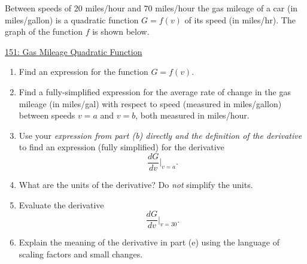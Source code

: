 \documentclass{ximera}
\begin{document}
\begin{question} \label{Q9df93rv}
Between speeds of $20$ miles/hour and $70$ miles/hour the gas mileage of a car (in miles/gallon) is a quadratic function $G=f(v)$ of its speed (in miles/hr). The graph of the function $f$ is shown below.

\begin{onlineOnly}
    \begin{center}
\end{center}
\end{onlineOnly}

\href{https://www.desmos.com/calculator/6bbnti8zm5}{151: Gas Mileage Quadratic Function}

\begin{enumerate}
\item Find an expression for the function $G=f(v)$.

\item Find a fully-simplified expression for the average rate of change in the gas mileage (in miles/gal) with respect to speed (measured in miles/gallon) between speeds $v=a$ and $v=b$, both measured in miles/hour.

\item  Use your \emph{expression from part (b) directly and the definition of the derivative} to find an expression (fully simplified) for the derivative
\[
   \frac{dG}{dv}\Big|_{v=a} .
\]

\item What are the units of the derivative? Do \emph{not} simplify the units.

\item Evaluate the derivative
\[
  \frac{dG}{dv}\Big|_{v=30} .
\]

\item  Explain the meaning of the derivative in part (e) using the language of scaling factors and small changes.

\end{enumerate}
\end{question}
\end{document}
